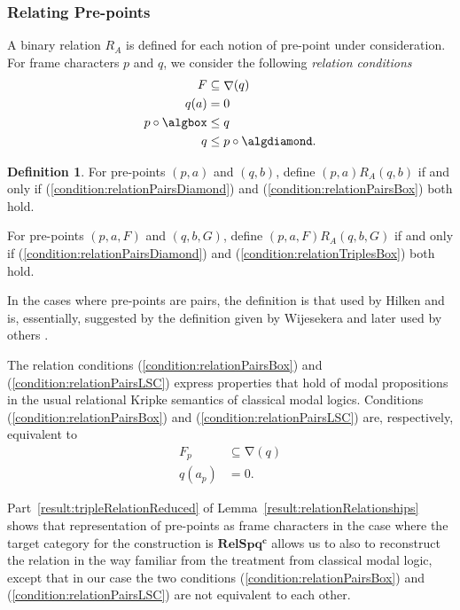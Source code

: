 \documentclass{article}[a4paper]
\theoremstyle{definition}
\newtheorem{definition}{Definition}%
\newcommand{\relspl}{\mathbf{RelSp^l}}
\newcommand{\relspqc}{\mathbf{RelSpq^c}}
\DeclareMathOperator{\charop}{\nabla}
\begin{document}
\subsubsection{Relating Pre-points}

 A binary relation $R_A$ is defined for each notion of pre-point under consideration. For frame characters $p$ and $q$, we consider the following \emph{relation conditions}
    \begin{align}
    \label{condition:relationTriplesBox}
        F
        & \subseteq \charop (q)
       \\ \label{condition:relationPairsDiamond}
        q(a) &= 0 
    \\
    \label{condition:relationPairsBox}
        p \circ \algbox &\leq q \\
\label{condition:relationPairsLSC}
        q &\leq p \circ \algdiamond .
    \end{align}
 
\begin{definition}
    For pre-points $(p,a)$ and $(q,b)$, define $(p,a) R_A (q,b)$ if and only if (\ref{condition:relationPairsDiamond}) and (\ref{condition:relationPairsBox})  both hold.
    
    For pre-points $(p,a,F)$ and $(q,b,G)$, define  $(p,a,F) R_A (q,b,G)$ if and only if (\ref{condition:relationPairsDiamond}) and (\ref{condition:relationTriplesBox}) both hold.
\end{definition}

In the cases where pre-points are  pairs, the definition is that used by Hilken \cite{hil00} and is, essentially, suggested by the definition given by Wijesekera \cite{wijesekera1990constructive} and later used by others \cite{AMPR01,MendlerPaiva2005}. 

The relation conditions (\ref{condition:relationPairsBox}) and (\ref{condition:relationPairsLSC}) express properties that hold of modal propositions in the usual relational Kripke semantics of classical modal logics. 
Conditions (\ref{condition:relationPairsBox}) and (\ref{condition:relationPairsLSC}) are, respectively, equivalent to 
\begin{align*}
    F_p &\subseteq \charop (q) \\
    q(a_p) &= 0 .
\end{align*}
    
Part~\ref{result:tripleRelationReduced} of Lemma~\ref{result:relationRelationships} shows that representation of pre-points as frame characters in the case where the target category for the construction is $\relspqc$ allows us to also to reconstruct the relation in the way familiar from the treatment from classical modal logic, except that in our case the two conditions (\ref{condition:relationPairsBox}) and (\ref{condition:relationPairsLSC}) are not equivalent to each other. 
\end{document}

